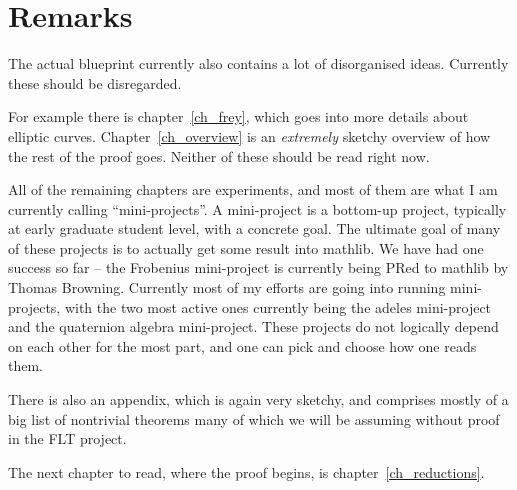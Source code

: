 \section{Remarks}

The actual blueprint currently also contains a lot of disorganised ideas. Currently these
should be disregarded.

For example there is chapter~\ref{ch_frey}, which goes into more details about elliptic curves.
Chapter~\ref{ch_overview} is an \emph{extremely} sketchy overview of how
the rest of the proof goes. Neither of these should be read right now.

All of the remaining chapters are experiments, and most of them are what I am currently
calling ``mini-projects''. A mini-project is a bottom-up project, typically at early graduate
student level, with a concrete goal. The ultimate goal of many of these projects is to actually
get some result into mathlib. We have had one success so far -- the Frobenius mini-project
is currently being PRed to mathlib by Thomas Browning. Currently most of my efforts are
going into running mini-projects, with the two most active ones currently being the adeles
mini-project and the quaternion algebra mini-project. These projects do not logically depend
on each other for the most part, and one can pick and choose how one reads them.

There is also an appendix, which is again very sketchy, and comprises mostly of a big
list of nontrivial theorems many of which we will be assuming without proof in the FLT
project.

The next chapter to read, where the proof begins, is chapter~\ref{ch_reductions}.
